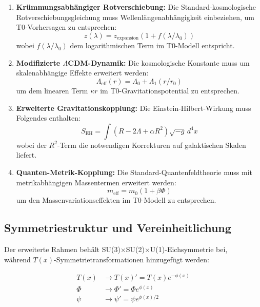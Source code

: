 \documentclass[12pt,a4paper]{article}
\newcommand{\Tfield}{T(x)}
\begin{document}
	\begin{enumerate}
		\item \textbf{Krümmungsabhängiger Rotverschiebung:} Die Standard-kosmologische Rotverschiebungsgleichung muss Wellenlängenabhängigkeit einbeziehen, um T0-Vorhersagen zu entsprechen:
		\begin{equation}
			z(\lambda) = z_{\text{expansion}} (1 + f(\lambda / \lambda_0))
		\end{equation}
		wobei $f(\lambda / \lambda_0)$ dem logarithmischen Term im T0-Modell entspricht.
		\item \textbf{Modifizierte $\Lambda$CDM-Dynamik:} Die kosmologische Konstante muss um skalenabhängige Effekte erweitert werden:
		\begin{equation}
			\Lambda_{\text{eff}}(r) = \Lambda_0 + \Lambda_1 (r / r_0)
		\end{equation}
		um dem linearen Term $\kappa r$ im T0-Gravitationspotential zu entsprechen.
		\item \textbf{Erweiterte Gravitationskopplung:} Die Einstein-Hilbert-Wirkung muss Folgendes enthalten:
		\begin{equation}
			S_{\text{EH}} = \int (R - 2 \Lambda + \alpha R^2) \sqrt{-g} \, d^4 x
		\end{equation}
		wobei der $R^2$-Term die notwendigen Korrekturen auf galaktischen Skalen liefert.
		\item \textbf{Quanten-Metrik-Kopplung:} Die Standard-Quantenfeldtheorie muss mit metrikabhängigen Massentermen erweitert werden:
		\begin{equation}
			m_{\text{eff}} = m_0 (1 + \beta \Phi)
		\end{equation}
		um den Massenvariationseffekten im T0-Modell zu entsprechen.
	\end{enumerate}
	
	\subsection{Symmetriestruktur und Vereinheitlichung}
	
	Der erweiterte Rahmen behält SU(3)$\times$SU(2)$\times$U(1)-Eichsymmetrie bei, \\während $\Tfield$-Symmetrietransformationen hinzugefügt werden:
	
	\begin{equation}
		\begin{aligned}
			\Tfield &\rightarrow \Tfield' = \Tfield e^{-\phi(x)} \\
			\Phi &\rightarrow \Phi' = \Phi e^{\phi(x)} \\
			\psi &\rightarrow \psi' = \psi e^{\phi(x)/2}
		\end{aligned}
	\end{equation}
	
\end{document}
